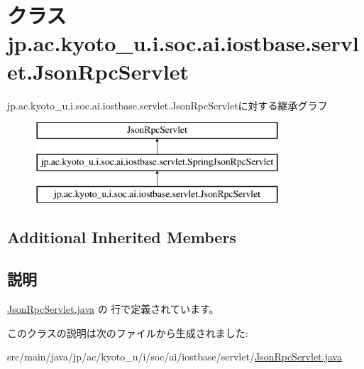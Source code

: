 \hypertarget{classjp_1_1ac_1_1kyoto__u_1_1i_1_1soc_1_1ai_1_1iostbase_1_1servlet_1_1_json_rpc_servlet}{\section{クラス jp.\-ac.\-kyoto\-\_\-u.\-i.\-soc.\-ai.\-iostbase.\-servlet.\-Json\-Rpc\-Servlet}
\label{classjp_1_1ac_1_1kyoto__u_1_1i_1_1soc_1_1ai_1_1iostbase_1_1servlet_1_1_json_rpc_servlet}
}
jp.\-ac.\-kyoto\-\_\-u.\-i.\-soc.\-ai.\-iostbase.\-servlet.\-Json\-Rpc\-Servletに対する継承グラフ\begin{figure}[H]
\begin{center}
\leavevmode
\includegraphics[height=3.000000cm]{classjp_1_1ac_1_1kyoto__u_1_1i_1_1soc_1_1ai_1_1iostbase_1_1servlet_1_1_json_rpc_servlet}
\end{center}
\end{figure}
\subsection*{Additional Inherited Members}


\subsection{説明}


 \hyperlink{_json_rpc_servlet_8java_source}{Json\-Rpc\-Servlet.\-java} の  行で定義されています。



このクラスの説明は次のファイルから生成されました\-:\begin{DoxyCompactItemize}
\item 
src/main/java/jp/ac/kyoto\-\_\-u/i/soc/ai/iostbase/servlet/\hyperlink{_json_rpc_servlet_8java}{Json\-Rpc\-Servlet.\-java}\end{DoxyCompactItemize}
